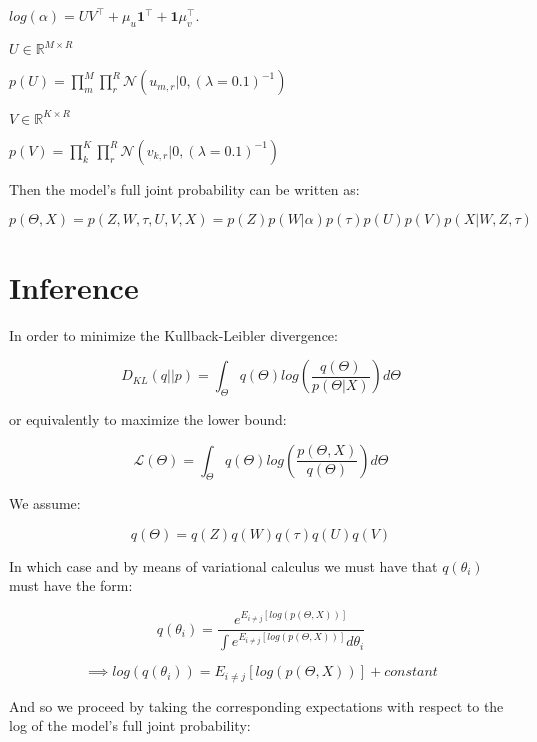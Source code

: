 \documentclass{article}
\begin{document}
\begin{description}
	\begin{description}
	\item$log(\alpha) = UV^\intercal + \mu_u \textbf{1}^\intercal + \textbf{1}\mu_v^\intercal$.
	\end{description}

\item $U \in \mathbb{R}^{M \times R}$
	\begin{description}
	\item $p(U) = \prod_m^M{\prod_r^R{\mathcal{N}(u_{m,r}|0, (\lambda=0.1)^{-1})}}$
	\end{description}
\item $V \in \mathbb{R}^{K \times R}$
	\begin{description}
	\item $p(V) = \prod_k^K{\prod_r^R{\mathcal{N}(v_{k,r}|0, (\lambda=0.1)^{-1})}}$
	\end{description}

\end{description}

\bigskip

Then the model's full joint probability can be written as:

$$p(\Theta,X) = p(Z,W,\tau,U,V,X) = p(Z)p(W|\alpha)p(\tau)p(U)p(V)p(X|W,Z,\tau)$$

\section*{Inference}

In order to minimize the Kullback-Leibler divergence:

$$D_{KL}(q||p) = \int_\Theta{q(\Theta)log(\frac{q(\Theta)}{p(\Theta|X)})d\Theta}$$

or equivalently to maximize the lower bound:

$$\mathcal{L}(\Theta) = \int_\Theta{q(\Theta)log(\frac{p(\Theta,X)}{q(\Theta)})d\Theta}$$

We assume:

$$q(\Theta) = q(Z)q(W)q(\tau)q(U)q(V)$$

In which case and by means of variational calculus we must have that $q(\theta_i)$ must have the form:

$$q(\theta_i) = \frac{e^{E_{i\neq j}[log(p(\Theta,X))]}}{\int{e^{E_{i\neq j}[log(p(\Theta,X))]}d\theta_i}}$$

$$\implies log(q(\theta_i)) = E_{i\neq j}[log(p(\Theta,X))] + constant$$

\bigskip

And so we proceed by taking the corresponding expectations with respect to the log of the model's full joint probability:
\end{document}
